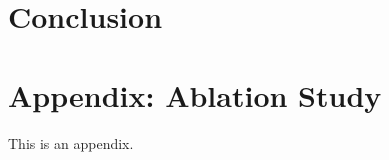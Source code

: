\documentclass[11pt]{article}
\begin{document}


\section{Conclusion} 
%





%



\clearpage
\appendix

\section{Appendix: Ablation Study}
\label{sec:appendixA}
This is an appendix.
\end{document}
